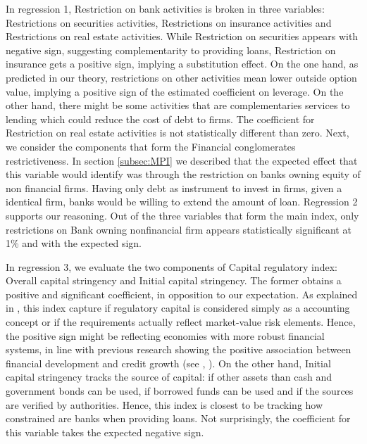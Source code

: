 \documentclass[12pt]{article}
\begin{document}
In regression 1, Restriction on bank activities is broken in three variables: Restrictions on securities activities, Restrictions on insurance activities and Restrictions on real estate activities. While Restriction on securities appears with negative sign, suggesting complementarity to providing loans, Restriction on insurance gets a positive sign, implying a substitution effect. On the one hand, as predicted in our theory, restrictions on other activities mean lower outside option value, implying a positive sign of the estimated coefficient on leverage. On the other hand, there might be some activities that are complementaries services to lending which could reduce the cost of debt to firms. The coefficient for Restriction on real estate activities is not statistically different than zero. Next, we consider the components that form the Financial conglomerates restrictiveness. In section \ref{subsec:MPI} we described that the expected effect that this variable would identify was through the restriction on banks owning equity of non financial firms. Having only debt as instrument to invest in firms, given a identical firm, banks would be willing to extend the amount of loan. Regression 2 supports our reasoning. Out of the three variables that form the main index, only restrictions on Bank owning nonfinancial firm appears statistically significant at 1\% and with the expected sign. 

In regression 3, we evaluate the two components of Capital regulatory index: Overall capital stringency and Initial capital stringency. The former obtains a positive and significant coefficient, in opposition to our expectation. As explained in \cite*{barth2001regulation}, this index capture if regulatory capital is considered simply as a accounting concept or if the requirements actually reflect market-value risk elements. Hence, the positive sign might be reflecting economies with more robust financial systems, in line with previous research showing the positive association between financial development and credit growth (see \cite*{demirgucc1998law}, \cite*{demirgucc2002funding}). On the other hand, Initial capital stringency tracks the source of capital: if other assets than cash and government bonds can be used, if borrowed funds can be used and if the sources are verified by authorities. Hence, this index is closest to be tracking how constrained are banks when providing loans. Not surprisingly, the coefficient for this variable takes the expected negative sign. 
\end{document}
